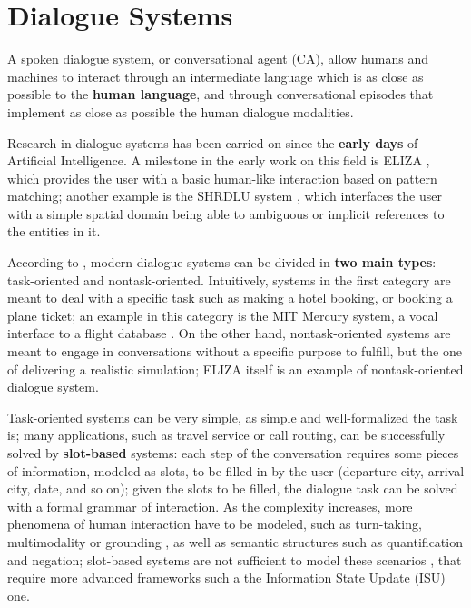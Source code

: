 
\section*{Dialogue Systems}

A spoken dialogue system, or conversational agent (CA), allow humans and machines to interact through an intermediate language which is as close as possible to the \textbf{human language}, and through conversational episodes that implement as close as possible the human dialogue modalities.

Research in dialogue systems has been carried on since the \textbf{early days} of Artificial Intelligence. A milestone in the early work on this field is ELIZA \cite{Weizenbaum:1966:ECP:365153.365168}, which provides the user with a basic human-like interaction based on pattern matching; another example is the SHRDLU system
, which interfaces the user with a simple spatial domain being able to ambiguous or implicit references to the entities in it.

According to \cite{Jokinen2009}, modern dialogue systems can be divided in \textbf{two main types}: task-oriented and nontask-oriented. Intuitively, systems in the first category are meant to deal with a specific task such as making a hotel booking, or booking a plane ticket; an example in this category is the MIT Mercury system, a vocal interface to a flight database \cite{Seneff:2000:DMM:1605285.1605288}. On the other hand, nontask-oriented systems are meant to engage in conversations without a specific purpose to fulfill, but the one of delivering a realistic simulation; ELIZA itself is an example of nontask-oriented dialogue system.

Task-oriented systems can be very simple, as simple and well-formalized the task is;  many applications, such as travel service or call routing, can be successfully solved by \textbf{slot-based} systems: each step of the conversation requires some pieces of information, modeled as slots, to be filled in by the user (departure city, arrival city, date, and so on); given the slots to be filled, the dialogue task can be solved with a formal grammar of interaction. As the complexity increases, more phenomena of human interaction have to be modeled, such as turn-taking, multimodality or grounding
, as well as semantic structures such as quantification and negation; slot-based systems are not sufficient to model these scenarios \cite{Gabsdil03clarificationin}, that require more advanced frameworks such a the Information State Update (ISU) one.


